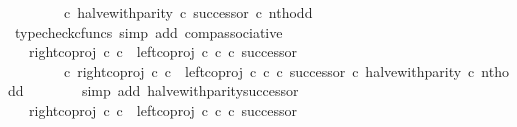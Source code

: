 \begin{isabellebody}
\ \ \ \ \ \ \ \ {\isasymcirc}\isactrlsub c\ {\isacharparenleft}{\kern0pt}halve{\isacharunderscore}{\kern0pt}with{\isacharunderscore}{\kern0pt}parity\ {\isasymcirc}\isactrlsub c\ successor{\isacharparenright}{\kern0pt}{\isacharparenright}{\kern0pt}\ {\isasymcirc}\isactrlsub c\ nth{\isacharunderscore}{\kern0pt}odd{\isachardoublequoteclose}\isanewline
\ \ \ \ \ \ \isamarkupfalse%
\ {\isacharparenleft}{\kern0pt}typecheck{\isacharunderscore}{\kern0pt}cfuncs{\isacharcomma}{\kern0pt}\ simp\ add{\isacharcolon}{\kern0pt}\ comp{\isacharunderscore}{\kern0pt}associative{}{\isacharparenright}{\kern0pt}\isanewline
\ \ \ \ \isamarkupfalse%
\ \isamarkupfalse%
\ {\isachardoublequoteopen}{\isachardot}{\kern0pt}{\isachardot}{\kern0pt}{\isachardot}{\kern0pt}\ {\isacharequal}{\kern0pt}\ {\isacharparenleft}{\kern0pt}right{\isacharunderscore}{\kern0pt}coproj\ {\isasymnat}\isactrlsub c\ {\isasymnat}\isactrlsub c\ {\isasymamalg}\ {\isacharparenleft}{\kern0pt}left{\isacharunderscore}{\kern0pt}coproj\ {\isasymnat}\isactrlsub c\ {\isasymnat}\isactrlsub c\ {\isasymcirc}\isactrlsub c\ successor{\isacharparenright}{\kern0pt}\isanewline
\ \ \ \ \ \ \ \ {\isasymcirc}\isactrlsub c\ {\isacharparenleft}{\kern0pt}right{\isacharunderscore}{\kern0pt}coproj\ {\isasymnat}\isactrlsub c\ {\isasymnat}\isactrlsub c\ {\isasymamalg}\ {\isacharparenleft}{\kern0pt}left{\isacharunderscore}{\kern0pt}coproj\ {\isasymnat}\isactrlsub c\ {\isasymnat}\isactrlsub c\ {\isasymcirc}\isactrlsub c\ successor{\isacharparenright}{\kern0pt}\ {\isasymcirc}\isactrlsub c\ halve{\isacharunderscore}{\kern0pt}with{\isacharunderscore}{\kern0pt}parity{\isacharparenright}{\kern0pt}{\isacharparenright}{\kern0pt}\ {\isasymcirc}\isactrlsub c\ nth{\isacharunderscore}{\kern0pt}odd{\isachardoublequoteclose}\isanewline
\ \ \ \ \ \ \isamarkupfalse%
\ {\isacharparenleft}{\kern0pt}simp\ add{\isacharcolon}{\kern0pt}\ halve{\isacharunderscore}{\kern0pt}with{\isacharunderscore}{\kern0pt}parity{\isacharunderscore}{\kern0pt}successor{\isacharparenright}{\kern0pt}\isanewline
\ \ \ \ \isamarkupfalse%
\ \isamarkupfalse%
\ {\isachardoublequoteopen}{\isachardot}{\kern0pt}{\isachardot}{\kern0pt}{\isachardot}{\kern0pt}\ {\isacharequal}{\kern0pt}\ {\isacharparenleft}{\kern0pt}right{\isacharunderscore}{\kern0pt}coproj\ {\isasymnat}\isactrlsub c\ {\isasymnat}\isactrlsub c\ {\isasymamalg}\ {\isacharparenleft}{\kern0pt}left{\isacharunderscore}{\kern0pt}coproj\ {\isasymnat}\isactrlsub c\ {\isasymnat}\isactrlsub c\ {\isasymcirc}\isactrlsub c\ successor{\isacharparenright}{\kern0pt}\isanewline

\end{isabellebody}
